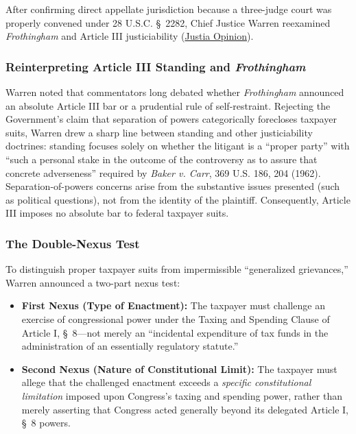\documentclass[12pt]{article}
\begin{document}
After confirming direct appellate jurisdiction because a three-judge court was properly convened under 28 U.S.C. \S\ 2282, Chief Justice Warren reexamined \textit{Frothingham} and Article III justiciability (\href{https://supreme.justia.com/cases/federal/us/392/83/}{Justia Opinion}).

\subsubsection{Reinterpreting Article III Standing and \textit{Frothingham}}

Warren noted that commentators long debated whether \textit{Frothingham} announced an absolute Article III bar or a prudential rule of self-restraint. Rejecting the Government's claim that separation of powers categorically forecloses taxpayer suits, Warren drew a sharp line between standing and other justiciability doctrines: standing focuses solely on whether the litigant is a ``proper party'' with ``such a personal stake in the outcome of the controversy as to assure that concrete adverseness'' required by \textit{Baker v. Carr}, 369 U.S. 186, 204 (1962). Separation-of-powers concerns arise from the substantive issues presented (such as political questions), not from the identity of the plaintiff. Consequently, Article III imposes no absolute bar to federal taxpayer suits.

\subsubsection{The Double-Nexus Test}

To distinguish proper taxpayer suits from impermissible ``generalized grievances,'' Warren announced a two-part nexus test:
\begin{itemize}
  \item \textbf{First Nexus (Type of Enactment):} The taxpayer must challenge an exercise of congressional power under the Taxing and Spending Clause of Article I, \S\ 8---not merely an ``incidental expenditure of tax funds in the administration of an essentially regulatory statute.''
  \item \textbf{Second Nexus (Nature of Constitutional Limit):} The taxpayer must allege that the challenged enactment exceeds a \textit{specific constitutional limitation} imposed upon Congress's taxing and spending power, rather than merely asserting that Congress acted generally beyond its delegated Article I, \S\ 8 powers.
\end{itemize}
\end{document}
